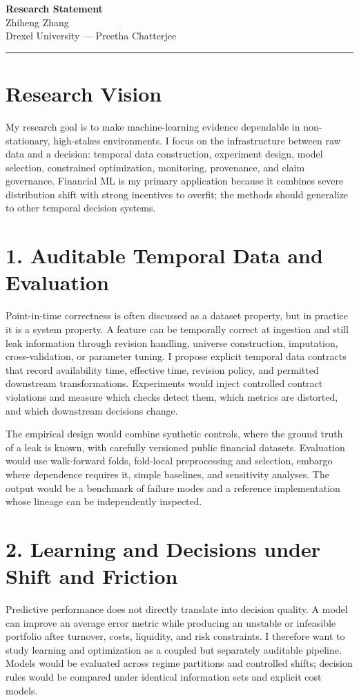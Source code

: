 \documentclass[11pt]{article}
\newcommand{\ApplicantName}{Zhiheng Zhang}
\begin{document}
\begin{center}
{\LARGE\bfseries Research Statement}\\[0.25em]
{\large \ApplicantName}\\
Drexel University --- Preetha Chatterjee
\end{center}
\vspace{0.35em}\hrule\vspace{0.65em}

\section*{Research Vision}
My research goal is to make machine-learning evidence dependable in non-stationary, high-stakes environments. I focus on the infrastructure between raw data and a decision: temporal data construction, experiment design, model selection, constrained optimization, monitoring, provenance, and claim governance. Financial ML is my primary application because it combines severe distribution shift with strong incentives to overfit; the methods should generalize to other temporal decision systems.

\section*{1. Auditable Temporal Data and Evaluation}
Point-in-time correctness is often discussed as a dataset property, but in practice it is a system property. A feature can be temporally correct at ingestion and still leak information through revision handling, universe construction, imputation, cross-validation, or parameter tuning. I propose explicit temporal data contracts that record availability time, effective time, revision policy, and permitted downstream transformations. Experiments would inject controlled contract violations and measure which checks detect them, which metrics are distorted, and which downstream decisions change.

The empirical design would combine synthetic controls, where the ground truth of a leak is known, with carefully versioned public financial datasets. Evaluation would use walk-forward folds, fold-local preprocessing and selection, embargo where dependence requires it, simple baselines, and sensitivity analyses. The output would be a benchmark of failure modes and a reference implementation whose lineage can be independently inspected.

\section*{2. Learning and Decisions under Shift and Friction}
Predictive performance does not directly translate into decision quality. A model can improve an average error metric while producing an unstable or infeasible portfolio after turnover, costs, liquidity, and risk constraints. I therefore want to study learning and optimization as a coupled but separately auditable pipeline. Models would be evaluated across regime partitions and controlled shifts; decision rules would be compared under identical information sets and explicit cost models.
\end{document}
